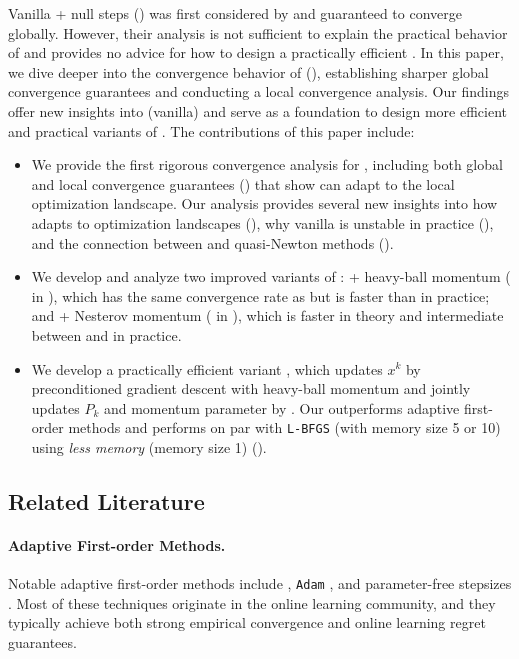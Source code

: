 Vanilla {\hdm} + null steps () was first considered by \cite{gao2024gradient} and guaranteed to converge globally.
However, their analysis is not sufficient to explain the practical behavior of {\hdm} and provides no advice for how to design a practically efficient {\hdm}.
In this paper, we dive deeper into the convergence behavior of {\hdm} (), establishing sharper global convergence guarantees and conducting a local convergence analysis. Our findings offer new insights into (vanilla) {\hdm} and serve as a foundation to design more efficient and practical variants of {\hdm}.
The contributions of this paper include:

\begin{itemize}[leftmargin=10pt]
    \item We provide the first rigorous convergence analysis for {\hdm}, including both global and local convergence guarantees () that show {\hdm} can adapt to the local optimization landscape. Our analysis provides several new insights into how {\hdm} adapts to optimization landscapes (), why vanilla {\hdm} is unstable in practice (), and the connection between {\hdm} and quasi-Newton methods (). 
    
    \item We develop and analyze two improved variants of {\hdm}: {\hdm} + heavy-ball momentum ({\hdmhb} in ), which has the same convergence rate as {\hdm} but is faster than {\hdm} in practice; and {\hdm} + Nesterov momentum ({\hdmagd} in ), which is faster in theory and intermediate between {\hdm} and {\hdmhb} in practice. 
    
    \item We develop a practically efficient variant {\hdmbest}, which updates $x^k$ by preconditioned gradient descent with heavy-ball momentum and jointly updates $P_k$ and momentum parameter by {\adagrad}.
    Our {\hdmbest} outperforms adaptive first-order methods and performs on par with \texttt{L-BFGS} (with memory size 5 or 10) using \emph{less memory} (memory size 1) ().
\end{itemize}


\subsection{Related Literature}

\paragraph{Adaptive First-order Methods.}
Notable adaptive first-order methods include {\adagrad} \cite{duchi2011adaptive,mcmahan2010adaptive}, \texttt{Adam} \cite{kingma2014adam,zhang2024adam}, and parameter-free stepsizes \cite{orabona2016coin,defazio2024road}.
Most of these techniques originate in the online learning community, and they typically achieve both strong empirical convergence and online learning regret guarantees.


